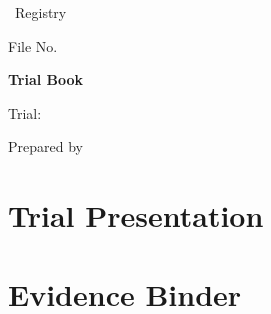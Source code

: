 



\begin{titlepage}
    \centering
    \vspace*{2cm}
    {\large \CaseCourt\par}
    {\large \CaseRegistry\ Registry\par}
    \vspace{0.5cm}
    {\large File No. \CaseFileNo\par}
    \vspace{2cm}
    {\Huge\bfseries Trial Book\par}
    \vspace{1cm}
    {\LARGE \CaseStyle\par}
    \vspace{2cm}
    {\large Trial: \CaseTrialDates\par}
    \vspace{1cm}
    {\large Prepared by \PartyName\par}
    \vfill
\end{titlepage}

\tableofcontents
\newpage

\part{Trial Presentation}






\part{Evidence Binder}



